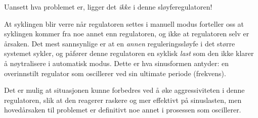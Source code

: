 
Uansett hva problemet er, ligger det {\it ikke} i denne sløyferegulatoren!







At syklingen blir verre når regulatoren settes i manuell modus forteller oss at syklingen kommer fra noe annet enn regulatoren, og ikke at regulatoren selv er årsaken. Det mest sannsynlige er at en {\it annen} reguleringssløyfe i det større systemet sykler, og påfører denne regulatoren en syklisk {\it last} som den ikke klarer å nøytralisere i automatisk modus. Dette er hva sinusformen antyder: en overinnstilt regulator som oscillerer ved sin ultimate periode (frekvens).

Det er mulig at situasjonen kunne forbedres ved å øke aggressiviteten i denne regulatoren, slik at den reagerer raskere og mer effektivt på sinuslasten, men hovedårsaken til problemet er definitivt noe annet i prosessen som oscillerer.


